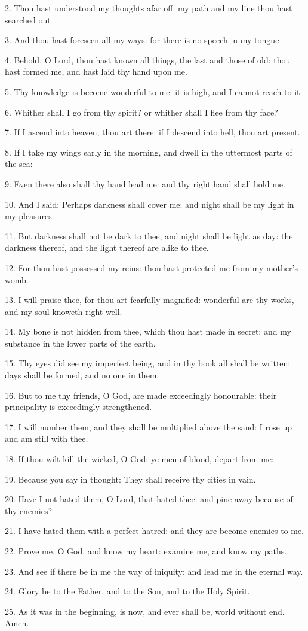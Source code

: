 2. Thou hast understood my thoughts afar off: my path and my line thou hast searched out
 	
3. And thou hast foreseen all my ways: for there is no speech in my tongue
 	
4. Behold, O Lord, thou hast known all things, the last and those of old: thou hast formed me, and hast laid thy hand upon me.
 	
5. Thy knowledge is become wonderful to me: it is high, and I cannot reach to it.
 	
6. Whither shall I go from thy spirit? or whither shall I flee from thy face?
 	
7. If I ascend into heaven, thou art there: if I descend into hell, thou art present.
 	
8. If I take my wings early in the morning, and dwell in the uttermost parts of the sea:
 	
9. Even there also shall thy hand lead me: and thy right hand shall hold me.
 	
10. And I said: Perhaps darkness shall cover me: and night shall be my light in my pleasures.
 	
11. But darkness shall not be dark to thee, and night shall be light as day: the darkness thereof, and the light thereof are alike to thee.
 	
12. For thou hast possessed my reins: thou hast protected me from my mother's womb.
 	
13. I will praise thee, for thou art fearfully magnified: wonderful are thy works, and my soul knoweth right well.
 	
14. My bone is not hidden from thee, which thou hast made in secret: and my substance in the lower parts of the earth.
 	
15. Thy eyes did see my imperfect being, and in thy book all shall be written: days shall be formed, and no one in them.
 	
16.  But to me thy friends, O God, are made exceedingly honourable: their principality is exceedingly strengthened.
 	
17.  I will number them, and they shall be multiplied above the sand: I rose up and am still with thee.
 	
18. If thou wilt kill the wicked, O God: ye men of blood, depart from me:
 	
19. Because you say in thought: They shall receive thy cities in vain.
 	
20. Have I not hated them, O Lord, that hated thee: and pine away because of thy enemies?

21. I have hated them with a perfect hatred: and they are become enemies to me.
 	
22. Prove me, O God, and know my heart: examine me, and know my paths.
 	
23. And see if there be in me the way of iniquity: and lead me in the eternal way.
 	
24. Glory be to the Father, and to the Son, and to the Holy Spirit.
 	
25. As it was in the beginning, is now, and ever shall be, world without end. Amen.
